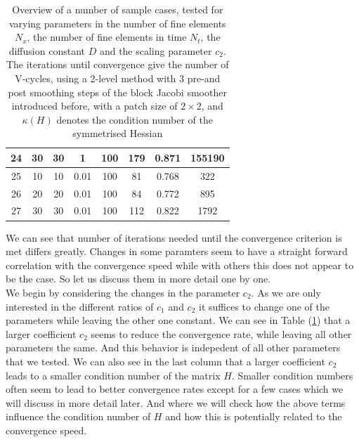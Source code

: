 \documentclass[../draft_1.tex]{subfiles}
\begin{document}
\begin{table}[]
\begin{tabular}{||c|c|c|c|c|c|c|c||}
		24 & 30 & 30 & 1 & 100 &  179 & 0.871 & 155190 \\ 
		\toprule
		25 & 10 & 10 & 0.01 & 100 & 81 & 0.768 & 322 \\ \hline
		26 & 20 & 20 & 0.01 & 100 & 84 & 0.772 & 895 \\ \hline
		27 & 30 & 30 & 0.01 & 100 & 112 & 0.822 &  1792\\ 
		\bottomrule
	\end{tabular}
\caption{Overview of a number of sample cases, tested for varying parameters in the number of fine elements $N_x$, the number of fine elements in time $N_t$, the diffusion constant $D$ and the scaling parameter $c_2$. The iterations until convergence give the number of V-cycles, using a 2-level method with 3 pre-and post smoothing steps of the block Jacobi smoother introduced before, with a patch size of $2 \times 2$, and $\kappa(H)$ denotes the condition number of the symmetrised Hessian}
	\label{table:convergence_results}
\end{table}

We can see that number of iterations needed until the convergence criterion is met differs greatly. Changes in some paramters seem to have a straight forward correlation with the convergence speed while with others this does not appear to be the case. So let us discuss them in more detail one by one.
\smallskip
\\
We begin by considering the changes in the parameter $c_2$. As we are only interested in the different ratios of $c_1$ and $c_2$ it suffices to change one of the parameters while leaving the other one constant. We can see in Table (\ref{table:convergence_results}) that a larger coefficient $c_2$ seems to reduce the convergence rate, while leaving all other parameters the same. And this behavior is indepedent of all other parameters that we tested. We can also see in the last column that a larger coefficient $c_2$ leads to a smaller condition number of the matrix $H$. Smaller condition numbers often seem to lead to better convergence rates except for a few cases which we will discuss in more detail later. And where we will check how the above terms influence the condition number of $H$ and how this is potentially related to the convergence speed. 
\end{document}
